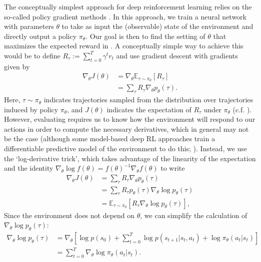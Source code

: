 The conceptually simplest approach for deep reinforcement learning relies on the so-called policy gradient methods \citep{sutton2018reinforcement}.
In this approach, we train a neural network with parameters $\theta$ to take as input the (observable) state of the environment and directly output a policy $\pi_\theta$.
Our goal is then to find the setting of $\theta$ that maximizes the expected reward in .
A conceptually simple way to achieve this would be to define $R_\tau := \sum_{t=0}^T \gamma^t r_t$ and use gradient descent with gradients given by
\begin{align}
    \nabla_\theta J(\theta) &= \nabla_\theta \mathbb{E}_{\tau \sim \pi_\theta} \left [ R_\tau \right ]\\
    &= \sum_{\tau} R_\tau \nabla_\theta p_\theta(\tau).
    \label{eq:simple_deriv}
\end{align}
Here, $\tau \sim \pi_\theta$ indicates trajectories sampled from the distribution over trajectories induced by policy $\pi_\theta$, and $J(\theta)$ indicates the expectation of $R_\tau$ under $\pi_\theta$ (c.f. ).
However, evaluating  requires us to know how the environment will respond to our actions in order to compute the necessary derivatives, which in general may not be the case (although some model-based deep RL approaches train a differentiable predictive model of the environment to do this; \citealp{clavera2020model}).
Instead, we use the `log-derivative trick', which takes advantage of the linearity of the expectation and the identity $\nabla_\theta \log f(\theta) = f(\theta)^{-1} \nabla_\theta f(\theta)$ to write
\begin{align}
    \label{eq:deriv_J}
    \nabla_\theta J(\theta) & = \sum_\tau R_\tau \nabla_\theta p_\theta(\tau) \\
                            & = \sum_\tau R_\tau p_\theta(\tau) \nabla_\theta \log p_\theta(\tau) \\
                            & = \mathbb{E}_{\tau \sim \pi_\theta} \left [ R_\tau \nabla_\theta \log p_\theta(\tau) \right ],
\end{align}
Since the environment does not depend on $\theta$, we can simplify the calculation of $\nabla_\theta \log p_\theta (\tau)$:
\begin{align}
    \label{eq:deriv_log_ptau}
    \nabla_\theta \log p_\theta(\tau) & = \nabla_\theta \left [ \log p(s_0) + \sum_{t=0}^T \log p(s_{t+1} | s_t, a_t) + \log \pi_\theta (a_t|s_t) \right ] \\
                                      & = \sum_{t=0}^T \nabla_\theta \log \pi_\theta (a_t|s_t).
\end{align}
